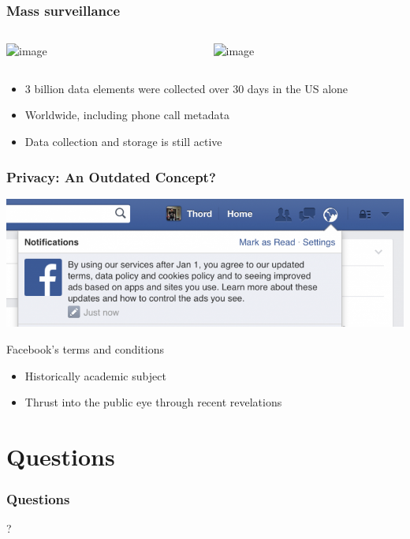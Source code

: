 \documentclass[12pt]{beamer}
\begin{document}
\begin{frame}
\frametitle{Mass surveillance}
\begin{columns}
\begin{column}{0.5\textwidth}
\begin{center}
\includegraphics<2->[scale=0.1]{snowden.jpg}
\break
{}
\end{center}
\end{column}
\begin{column}{0.5\textwidth}
\begin{center}
\includegraphics<2->[scale=0.2]{BoundlessInformant.PNG}
\break
{}
\end{center}
\end{column}
\end{columns}
\begin{itemize}
\item<3-> 3 billion data elements were collected over 30 days in the US alone
\item<3-> Worldwide, including phone call metadata
\item<3-> Data collection and storage is still active
\end{itemize}
\end{frame}

\begin{frame}
\frametitle{Privacy: An Outdated Concept?}
\begin{center}
\includegraphics[scale=0.3]{facebook_terms.PNG}
\break
\caption{Facebook's terms and conditions\cite{fbterms}}
\end{center}
\begin{itemize}
\item<2-> Historically academic subject
\item<2-> Thrust into the public eye through recent revelations
\end{itemize}
\end{frame}

\section{Questions}

\begin{frame}
\frametitle{Questions}
\begin{center}
\Huge{?}
\end{center}
\end{frame}

\printbibliography

 
\end{document}
